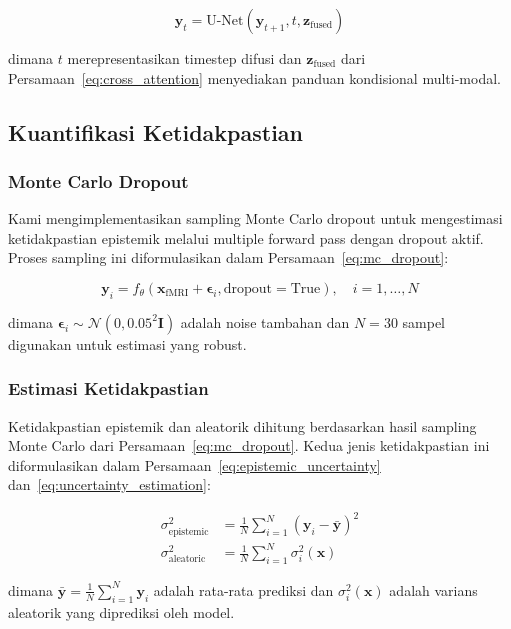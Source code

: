 \begin{equation}
\mathbf{y}_t = \text{U-Net}(\mathbf{y}_{t+1}, t, \mathbf{z}_{\text{fused}})
\label{eq:unet}
\end{equation}

dimana $t$ merepresentasikan timestep difusi dan $\mathbf{z}_{\text{fused}}$ dari Persamaan~\ref{eq:cross_attention} menyediakan panduan kondisional multi-modal.

\subsection{Kuantifikasi Ketidakpastian}

\subsubsection{Monte Carlo Dropout}
Kami mengimplementasikan sampling Monte Carlo dropout untuk mengestimasi ketidakpastian epistemik melalui multiple forward pass dengan dropout aktif. Proses sampling ini diformulasikan dalam Persamaan~\ref{eq:mc_dropout}:

\begin{equation}
\mathbf{y}_i = f_{\theta}(\mathbf{x}_{\text{fMRI}} + \boldsymbol{\epsilon}_i, \text{dropout}=\text{True}), \quad i = 1, \ldots, N
\label{eq:mc_dropout}
\end{equation}

dimana $\boldsymbol{\epsilon}_i \sim \mathcal{N}(0, 0.05^2 \mathbf{I})$ adalah noise tambahan dan $N = 30$ sampel digunakan untuk estimasi yang robust.

\subsubsection{Estimasi Ketidakpastian}
Ketidakpastian epistemik dan aleatorik dihitung berdasarkan hasil sampling Monte Carlo dari Persamaan~\ref{eq:mc_dropout}. Kedua jenis ketidakpastian ini diformulasikan dalam Persamaan~\ref{eq:epistemic_uncertainty} dan~\ref{eq:uncertainty_estimation}:

\begin{align}
\sigma_{\text{epistemic}}^2 &= \frac{1}{N} \sum_{i=1}^N (\mathbf{y}_i - \bar{\mathbf{y}})^2 \label{eq:epistemic_uncertainty} \\
\sigma_{\text{aleatoric}}^2 &= \frac{1}{N} \sum_{i=1}^N \sigma_i^2(\mathbf{x}) \label{eq:uncertainty_estimation}
\end{align}

dimana $\bar{\mathbf{y}} = \frac{1}{N} \sum_{i=1}^N \mathbf{y}_i$ adalah rata-rata prediksi dan $\sigma_i^2(\mathbf{x})$ adalah varians aleatorik yang diprediksi oleh model.

